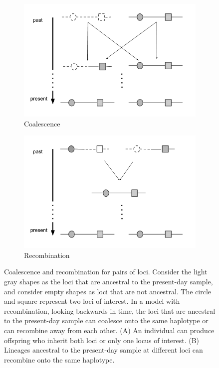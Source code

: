 \documentclass[11pt,oneside]{amsart}
\begin{document}
\begin{figure}[ht]
\centering
\captionsetup[subfigure]{justification=centering}
    \begin{subfigure}{.45\textwidth}
        \centering
        \includegraphics[width=\linewidth]{coalescence.png} 
        \caption{Coalescence} 
    \end{subfigure} %
    \begin{subfigure}{.45\textwidth}
        \centering
        \includegraphics[width=\linewidth]{recombination.png}
        \caption{Recombination}
    \end{subfigure} 
\caption{Coalescence and recombination for pairs of loci. Consider the light gray shapes as the loci that are ancestral to the present-day sample, and consider empty shapes as loci that are not ancestral. The circle and square represent two loci of interest. In a model with recombination, looking backwards in time, the loci that are ancestral to the present-day sample can coalesce onto the same haplotype or can recombine away from each other. (A) An individual can produce offspring who inherit both loci or only one locus of interest. (B) Lineages ancestral to the present-day sample at different loci can recombine onto the same haplotype.} 
\label{Figure: coalescence and recombination}
\end{figure}
\end{document}
